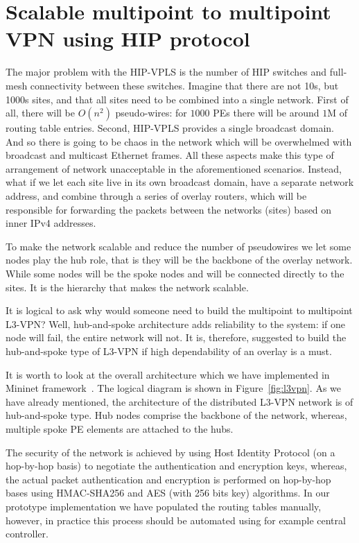 \section{Scalable multipoint to multipoint VPN using HIP protocol}

The major problem with the HIP-VPLS is the number of HIP switches and
full-mesh connectivity between these switches. Imagine that there are 
not 10s, but 1000s sites, and that all sites need to be 
combined into a single network. First of all, there will be 
$O(n^2)$ pseudo-wires: for $1000$ PEs there will be  
around $1$M of routing table entries. Second, HIP-VPLS provides 
a single broadcast domain. And so there is going to be 
chaos in the network which will be overwhelmed with broadcast
and multicast Ethernet frames. All these aspects make this type of
arrangement of network unacceptable in the aforementioned scenarios.
Instead, what if we let each site live in its own broadcast
domain, \ie have a separate network address, and combine through 
a series of overlay routers, which will be responsible for 
forwarding the packets between the networks (sites) based on 
inner IPv4 addresses. 

To make the network scalable and reduce the number of pseudowires
we let some nodes play the hub role, that is they will be the backbone 
of the overlay network. While some nodes will be the spoke nodes
and will be connected directly to the sites. It is the hierarchy 
that makes the network scalable. 

It is logical to ask why would someone need to build the multipoint to 
multipoint L3-VPN? Well, hub-and-spoke architecture adds reliability 
to the system: if one node will fail, the entire network will not.
It is, therefore, suggested to build the hub-and-spoke type of L3-VPN
if high dependability of an overlay is a must.

It is worth to look at the overall architecture which we have implemented in
Mininet framework~\cite{hip-l3vpn}. The logical diagram is shown in Figure~\ref{fig:l3vpn}. 
As we have already mentioned, the architecture of the distributed 
L3-VPN network is of hub-and-spoke type. Hub nodes comprise the backbone of the network, whereas,
multiple spoke PE elements are attached to the hubs. 

The security of the network is achieved by using Host Identity Protocol (on a hop-by-hop basis) to negotiate
the authentication and encryption keys, whereas, the actual packet authentication
and encryption is performed on hop-by-hop bases using HMAC-SHA256
and AES (with 256 bits key) algorithms. In our prototype implementation we 
have populated the routing tables manually, however, in practice this 
process should be automated using for example central controller. 

